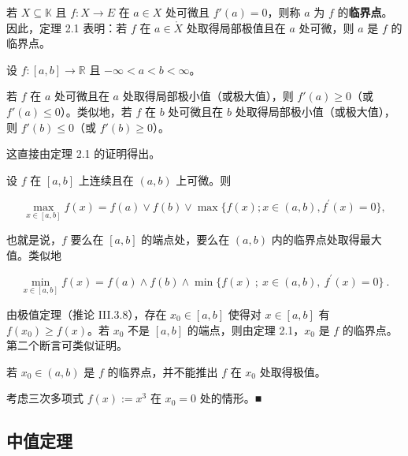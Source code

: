 若 $X \subseteq \mathbb{K}$ 且 $f: X \to E$ 在 $a \in X$ 处可微且 $f'(a) = 0$，则称 $a$ 为 $f$ 的\textbf{临界点}。因此，定理 2.1 表明：若 $f$ 在 $a \in \mathring{X}$ 处取得局部极值且在 $a$ 处可微，则 $a$ 是 $f$ 的临界点。

\begin{remark}

设 $ f\colon [a,b] \to \mathbb{R} $ 且 $ -\infty < a < b < \infty $。

\begin{items}
\item

若 $f$ 在 $a$ 处可微且在 $a$ 处取得局部极小值（或极大值），则 $f'(a) \geq 0$（或 $f'(a) \leq 0$）。类似地，若 $f$ 在 $b$ 处可微且在 $b$ 处取得局部极小值（或极大值），则 $f'(b) \leq 0$（或 $f'(b) \geq 0$）。

\proofhead
这直接由定理 2.1 的证明得出。
\end{items}


\begin{items}
\item[（b）]

设 $f$ 在 $ [a,b] $ 上连续且在 $ (a,b) $ 上可微。则

\[
\max_{x\in[a,b]}f(x)=f(a)\lor f(b)\lor\max\{f(x);x\in(a,b),f^{\prime}(x)=0\},
\]

也就是说，$f$ 要么在 $[a,b]$ 的端点处，要么在 $(a,b)$ 内的临界点处取得最大值。类似地

\[
\min_{x\in[a,b]}f(x)=f(a)\land f(b)\land\min\{f(x)~;~x\in(a,b),~f^{\prime}(x)=0\}~.
\]

\proofhead
由极值定理（推论 III.3.8），存在 $ x_0 \in [a, b] $ 使得对 $ x \in [a, b] $ 有 $ f(x_0) \geq f(x) $。若 $ x_0 $ 不是 $ [a, b] $ 的端点，则由定理 2.1，$ x_0 $ 是 $ f $ 的临界点。第二个断言可类似证明。
\item[（c）]

若 $ x_0 \in (a, b) $ 是 $ f $ 的临界点，并不能推出 $ f $ 在 $ x_0 $ 处取得极值。

\proofhead
考虑三次多项式 $ f(x) := x^3 $ 在 $ x_0 = 0 $ 处的情形。■
\end{items}

\end{remark}

\subsection*{中值定理}

